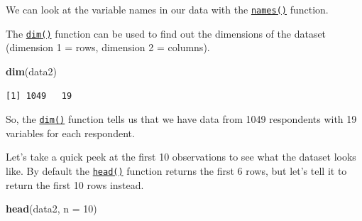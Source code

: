 \documentclass[]{article}
\newenvironment{Shaded}{\begin{snugshade}}{\end{snugshade}}
\newcommand{\KeywordTok}[1]{\textcolor[rgb]{0.13,0.29,0.53}{\textbf{#1}}}
\newcommand{\DataTypeTok}[1]{\textcolor[rgb]{0.13,0.29,0.53}{#1}}
\newcommand{\DecValTok}[1]{\textcolor[rgb]{0.00,0.00,0.81}{#1}}
\newcommand{\NormalTok}[1]{#1}
\theoremstyle{definition}
\theoremstyle{definition}
\theoremstyle{definition}
\theoremstyle{remark}
\begin{document}
We can look at the variable names in our data with the
\href{http://bit.ly/R_names}{\texttt{names()}} function.

The \href{http://bit.ly/R_dim}{\texttt{dim()}} function can be used to
find out the dimensions of the dataset (dimension 1 = rows, dimension 2
= columns).

\begin{Shaded}
\begin{Highlighting}[]
\KeywordTok{dim}\NormalTok{(data2)}
\end{Highlighting}
\end{Shaded}

\begin{verbatim}
[1] 1049   19
\end{verbatim}

So, the \href{http://bit.ly/R_dim}{\texttt{dim()}} function tells us
that we have data from 1049 respondents with 19 variables for each
respondent.

Let's take a quick peek at the first 10 observations to see what the
dataset looks like. By default the
\href{http://bit.ly/R_head}{\texttt{head()}} function returns the first
6 rows, but let's tell it to return the first 10 rows instead.

\begin{Shaded}
\begin{Highlighting}[]
\KeywordTok{head}\NormalTok{(data2, }\DataTypeTok{n =} \DecValTok{10}\NormalTok{)}
\end{Highlighting}
\end{Shaded}
\end{document}
